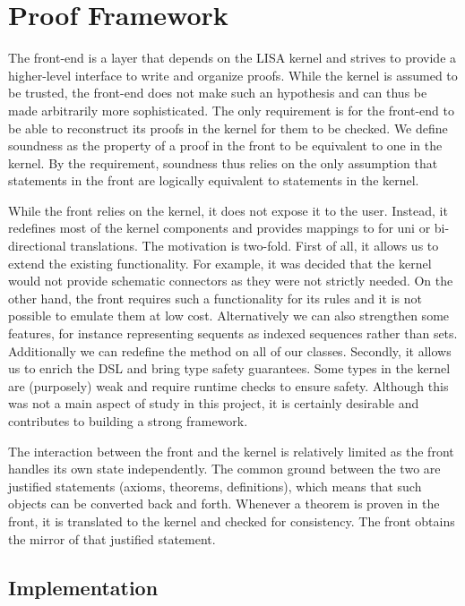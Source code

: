 \section{Proof Framework}
\label{sec:proof-framework}

The front-end is a layer that depends on the LISA kernel and strives to provide a higher-level interface to write and organize proofs. While the kernel is assumed to be trusted, the front-end does not make such an hypothesis and can thus be made arbitrarily more sophisticated. The only requirement is for the front-end to be able to reconstruct its proofs in the kernel for them to be checked. We define soundness as the property of a proof in the front to be equivalent to one in the kernel. By the requirement, soundness thus relies on the only assumption that statements in the front are logically equivalent to statements in the kernel.

While the front relies on the kernel, it does not expose it to the user. Instead, it redefines most of the kernel components and provides mappings to for uni or bi-directional translations. The motivation is two-fold. First of all, it allows us to extend the existing functionality. For example, it was decided that the kernel would not provide schematic connectors as they were not strictly needed. On the other hand, the front requires such a functionality for its rules and it is not possible to emulate them at low cost. Alternatively we can also strengthen some features, for instance representing sequents as indexed sequences rather than sets. Additionally we can redefine the method  on all of our classes. Secondly, it allows us to enrich the DSL and bring type safety guarantees. Some types in the kernel are (purposely) weak and require runtime checks to ensure safety. Although this was not a main aspect of study in this project, it is certainly desirable and contributes to building a strong framework.

The interaction between the front and the kernel is relatively limited as the front handles its own state independently. The common ground between the two are justified statements (axioms, theorems, definitions), which means that such objects can be converted back and forth. Whenever a theorem is proven in the front, it is translated to the kernel and checked for consistency. The front obtains the mirror of that justified statement.

\subsection{Implementation}

